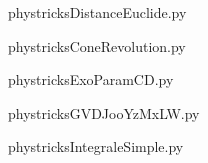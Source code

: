     

    \clearpage
    


    \newcommand{\CaptionFigDistanceEuclide}{<+Type your caption here+>}
    \begin{center}
        
    \end{center}
    phystricksDistanceEuclide.py

    

    \clearpage
    


    \newcommand{\CaptionFigConeRevolution}{<+Type your caption here+>}
    \begin{center}
        
    \end{center}
    phystricksConeRevolution.py

    

    \clearpage
    


    \newcommand{\CaptionFigExoParamCD}{<+Type your caption here+>}
    \begin{center}
        
    \end{center}
    phystricksExoParamCD.py

    

    \clearpage
    


    \newcommand{\CaptionFigGVDJooYzMxLW}{<+Type your caption here+>}
    \begin{center}
        
    \end{center}
    phystricksGVDJooYzMxLW.py

    

    \clearpage
    


    \newcommand{\CaptionFigIntegraleSimple}{<+Type your caption here+>}
    \begin{center}
        
    \end{center}
    phystricksIntegraleSimple.py

    

    \clearpage
    

